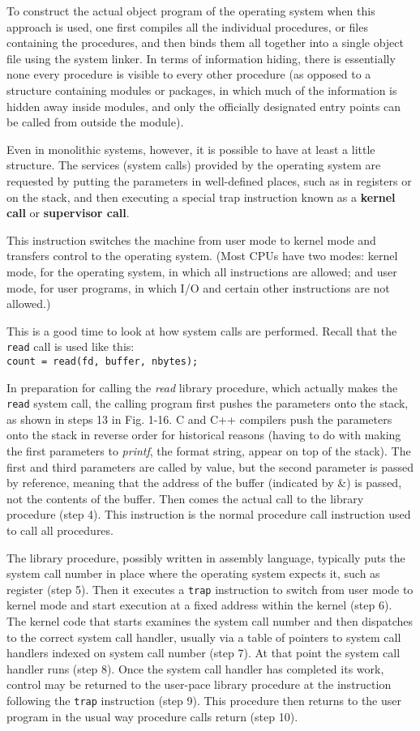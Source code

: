 \documentclass{book}
\newcommand {\kw}  [1] {\textbf{#1}}
\newcommand {\sys} [1] {\textsl{#1}}
\newcommand {\cmd} [1] {\texttt{#1}}
\begin{document}
To construct the actual object program of the operating system when this approach is used, 
one first compiles all the individual procedures, or files containing the procedures, 
and then binds them all together into a single object file using the system linker.
In terms of information hiding, there is essentially none every procedure is visible to every other procedure
(as opposed to a structure containing modules or packages, in which much of the information is hidden away inside modules,
and only the officially designated entry points can be called from outside the module).  

Even in monolithic systems, however, it is possible to have at least a little structure.
The services (system calls) provided by the operating system are requested by 
putting the parameters in well-defined places, such as in registers or on the stack,
and then executing a special trap instruction known as a \kw{kernel call} or \kw{supervisor call}.

This instruction switches the machine from user mode to kernel mode and transfers control to the operating system.
(Most CPUs have two modes: kernel mode, for the operating system, in which all instructions are allowed;
and user mode, for user programs, in which I/O and certain other instructions are not allowed.)

This is a good time to look at how system calls are performed.
Recall that the \cmd{read} call is used like this:\\
\cmd{count = read(fd, buffer, nbytes);}

In preparation for calling the \sys{read} library procedure, which actually makes the \cmd{read} system call,
the calling program first pushes the parameters onto the stack, as shown in steps 13 in Fig. 1-16.
C and C++ compilers push the parameters onto the stack in reverse order for historical reasons
(having to do with making the first parameters to \sys{printf}, the format string, appear on top of the stack).
The first and third parameters are called by value, but the second parameter is passed by reference,
meaning that the address of the buffer (indicated by \&) is passed, not the contents of the buffer.
Then comes the actual call to the library procedure (step 4).
This instruction is the normal procedure call instruction used to call all procedures.

The library procedure, possibly written in assembly language, 
typically puts the system call number in place where the operating system expects it, such as register (step 5).
Then it executes a \cmd{trap} instruction to switch from user mode to kernel mode 
and start execution at a fixed address within the kernel (step 6).
The kernel code that starts examines the system call number and then dispatches to the correct system call handler,
usually via a table of pointers to system call handlers indexed on system call number (step 7).
At that point the system call handler runs (step 8).
Once the system call handler has completed its work, 
control may be returned to the user-pace library procedure at the instruction following the \cmd{trap} instruction (step 9).
This procedure then returns to the user program in the usual way procedure calls return (step 10).
\end{document}
